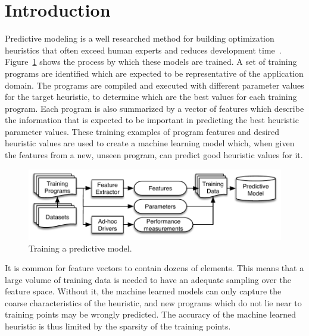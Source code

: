 \section{Introduction}

Predictive modeling is a well researched method for building optimization heuristics that often exceed human experts and reduces development time~\cite{Micolet2016,Wang2014c,Magni2014,Cummins2016,Wang2009,Wen2015,Wang2010,Falch2015,Collins2012,Leather2014,Ogilvie2014a}. Figure~\ref{fig:overview} shows the process by which these models are trained. A set of training programs are identified which are expected to be representative of the application domain. The programs are compiled and executed with different parameter values for the target heuristic, to determine which are the best values for each training program. Each program is also summarized by a vector of features which describe the information that is expected to be important in predicting the best heuristic parameter values. These training examples of program features and desired heuristic values are used to create a machine learning model which, when given the features from a new, unseen program, can predict good heuristic values for it.

\begin{figure}
  \includegraphics[width=\columnwidth]{img/overview-a}%
  \caption{Training a predictive model.}%
  \label{fig:overview}
\end{figure}

It is common for feature vectors to contain dozens of elements. This means that a large volume of training data is needed to have an adequate sampling over the feature space. Without it, the machine learned models can only capture the coarse characteristics of the heuristic, and new programs which do not lie near to training points may be wrongly predicted. The accuracy of the machine learned heuristic is thus limited by the sparsity of the training points.

